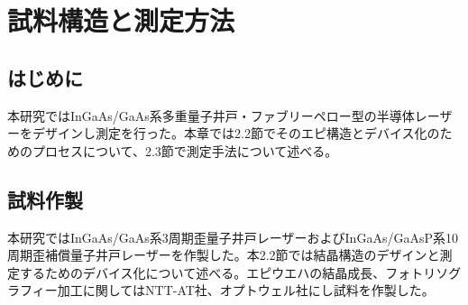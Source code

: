 
\chapter{試料構造と測定方法}%
\section{はじめに}%
本研究ではInGaAs/GaAs系多重量子井戸・ファブリーペロー型の半導体レーザーをデザインし測定を行った。本章では2.2節でそのエピ構造とデバイス化のためのプロセスについて、2.3節で測定手法について述べる。
\section{試料作製}%
本研究ではInGaAs/GaAs系3周期歪量子井戸レーザーおよびInGaAs/GaAsP系10周期歪補償量子井戸レーザーを作製した。本2.2節では結晶構造のデザインと測定するためのデバイス化について述べる。エピウエハの結晶成長、フォトリソグラフィー加工に関してはNTT-AT社、オプトウェル社にし試料を作製した。

